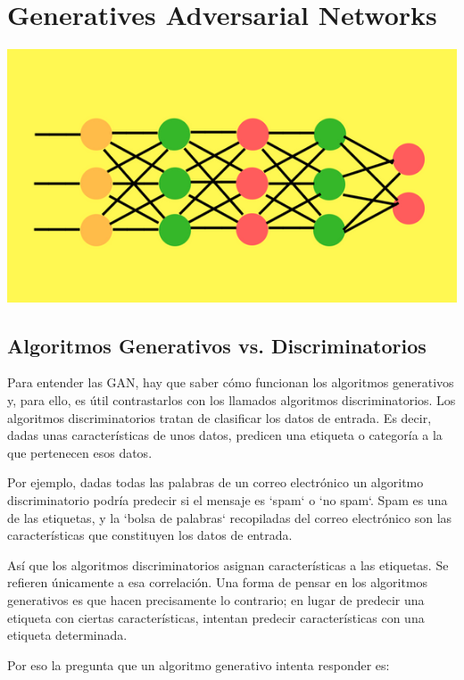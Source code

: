 \documentclass[a4paper]{article}
\begin{document}
\section{Generatives Adversarial Networks}
\begin{center}

\includegraphics[scale=0.5]{./images/gan.png}

\end{center}
\subsection{Algoritmos Generativos vs. Discriminatorios}

Para entender las GAN, hay que saber cómo funcionan los algoritmos 
generativos y, para ello, es útil contrastarlos con los llamados 
algoritmos discriminatorios. Los algoritmos discriminatorios 
tratan de clasificar los datos de entrada. Es decir, dadas unas 
características de unos datos, predicen una etiqueta o categoría a 
la que pertenecen esos datos.

Por ejemplo, dadas todas las palabras de un correo electrónico un 
algoritmo discriminatorio podría predecir si el mensaje es `spam` 
o `no spam`. Spam es una de las etiquetas, y la `bolsa de 
palabras` recopiladas del correo electrónico son las 
características que constituyen los datos de entrada.

Así que los algoritmos discriminatorios asignan características a 
las etiquetas. Se refieren únicamente a esa correlación. Una forma 
de pensar en los algoritmos generativos es que hacen precisamente 
lo contrario; en lugar de predecir una etiqueta con ciertas 
características, intentan predecir características con una 
etiqueta determinada.

Por eso la pregunta que un algoritmo generativo intenta responder 
es:
\end{document}

